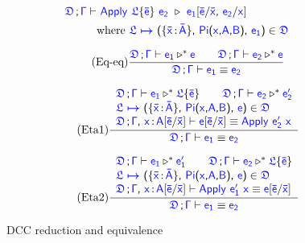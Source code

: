\begin{figure}[H]
\renewcommand{\arraystretch}{1.3}

	\begin{align*}
		\targetcon \vdash &\ \target{Apply\ } \target{\flabel}\{\target{\bar{e}}\}\ \target{e_2}\ \triangleright\  
		\target{e_1}[\target{\bar{e}} \slash \target{\bar{x}} \sfcomma \target{e_2} \slash \target{x}] \\
		& \text{where } \itemdef{\target{\flabel}}{\itemtype{\bar{x}}{\bar{A}}}{\targetpi{x}{A}{B}}{\target{e_1}} \in \target{\fdef}
	\end{align*}

	\begin{equation}
		\tag{Eq-eq}
		\frac
			{\target{\fdef}\semicolon \target{\Gamma} \vdash \target{e_1} \triangleright^* \target{e} \qquad 
			 \target{\fdef}\semicolon \target{\Gamma} \vdash \target{e_2} \triangleright^* \target{e}}
			{\target{\fdef}\semicolon \target{\Gamma} \vdash \target{e_1} \equiv \target{e_2}}
	\end{equation}

	\begin{equation}
		\tag{Eta1}
		\frac
			{\begin{array}{l}
			  \target{\fdef}\semicolon \target{\Gamma} \vdash \target{e_1} \triangleright^* \targetlab{\flabel}{\bar{e}} \qquad
	          \target{\fdef}\semicolon \target{\Gamma} \vdash \target{e_2} \triangleright^* \target{e_2'} \\
	          \itemdef{\target{\flabel}}{\itemtype{\bar{x}}{\bar{A}}}{\targetpi{x}{A}{B}}{\target{e}} \in \target{\fdef} \\
	          \target{\fdef}\semicolon \target{\Gamma}\sfcomma \itemtype{x}{A} \targetsub{\bar{e}}{\bar{x}} \vdash 
	          \target{e}\targetsub{\bar{e}}{\bar{x}} \equiv \targetapp{e_2'}{x}
        	\end{array}}
			{\target{\fdef}\semicolon \target{\Gamma} \vdash \target{e_1} \equiv \target{e_2}}
	\end{equation}

	\begin{equation}
		\tag{Eta2}
		\frac
			{\begin{array}{l}
			  \target{\fdef}\semicolon \target{\Gamma} \vdash \target{e_1} \triangleright^* \target{e_1'} \qquad
	          \target{\fdef}\semicolon \target{\Gamma} \vdash \target{e_2} \triangleright^* \targetlab{\flabel}{\bar{e}} \\
	          \itemdef{\target{\flabel}}{\itemtype{\bar{x}}{\bar{A}}}{\targetpi{x}{A}{B}}{\target{e}} \in \target{\fdef} \\
	          \target{\fdef}\semicolon \target{\Gamma}\sfcomma \itemtype{x}{A} \targetsub{\bar{e}}{\bar{x}} \vdash 
	          \targetapp{e_1'}{x} \equiv \target{e}\targetsub{\bar{e}}{\bar{x}}
        	\end{array}}
			{\target{\fdef}\semicolon \target{\Gamma} \vdash \target{e_1} \equiv \target{e_2}}
	\end{equation}

	\caption{DCC reduction and equivalence}
    \label{fig:dcc equivalence}
\end{figure}

